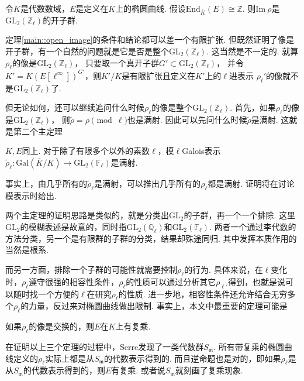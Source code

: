 \begin{cthm}
    令$K$是代数数域，$E$是定义在$K$上的椭圆曲线. 假设$\mathrm{End}_{\overline{K}}(E) \cong \mathbb{Z}$. 则$\mathrm{Im}\ \rho$是$\mathrm{GL}_2(\mathbb{Z}_{\ell})$的开子群. \label{main::open_image}
\end{cthm}

定理\ref{main::open_image}的条件和结论都可以差一个有限扩张.
但既然证明了像是开子群，有一个自然的问题就是它是否是整个$\mathrm{GL}_2(\mathbb{Z}_{\ell})$.
这当然是不一定的. 就算$\rho_{\ell}$的像是$\mathrm{GL}_2(\mathbb{Z}_{\ell})$，
只要取一个真开子群$G'\subset \mathrm{GL}_2(\mathbb{Z}_{\ell})$，
并令$K' = K(E[\ell^{\infty}])^{G'}$，则$K'/K$是有限扩张且定义在$K'$上的$\ell$进表示
$\rho_{\ell}'$的像就不是$\mathrm{GL}_2(\mathbb{Z}_{\ell})$了.

但无论如何，还可以继续追问什么时候$\rho_{\ell}$的像是整个$\mathrm{GL}_2(\mathbb{Z}_{\ell})$.
首先，如果$\rho_{\ell}$的像是$\mathrm{GL}_2(\mathbb{Z}_{\ell})$，
则$\tilde{\rho} = \rho \pmod{\ell}$也是满射.
因此可以先问什么时候$\tilde{\rho}$是满射. 这就是第二个主定理

\begin{cthm}
    $K, E$同上. 对于除了有限多个以外的素数$\ell$，模$\ell$Galois表示$\tilde{\rho}_{\ell}: \mathrm{Gal}(\overline{K}/K)\to \mathrm{GL}_2(\mathbb{F}_{\ell})$是满射. \label{main::surjective}
\end{cthm}

事实上，由几乎所有的$\tilde{\rho}_{\ell}$是满射，可以推出几乎所有的$\rho_{\ell}$都是满射.
证明将在讨论模表示时给出.

两个主定理的证明思路是类似的，就是分类出$\mathrm{GL}_2$的子群，再一个一个排除. 这里$\mathrm{GL}_2$的模糊表述是故意的，同时指$\mathrm{GL}_2(\mathbb{Q}_{\ell})$和$\mathrm{GL}_2(\mathbb{F}_{\ell})$. 两者一个通过李代数的方法分类，另一个是有限群的子群的分类，结果却殊途同归. 其中发挥本质作用的当然是根系.

而另一方面，排除一个子群的可能性就需要控制$\rho_{\ell}$的行为. 具体来说，在$\ell$变化时，$\rho_{\ell}$遵守很强的相容性条件，$\rho_{\ell}$的性质可以通过分析其它$\rho_{\ell'}$得到，也就是说可以随时找一个方便的$\ell$在研究$\rho_{\ell}$的性质. 进一步地，相容性条件还允许结合无穷多个$\rho_{\ell}$的力量，反过来对椭圆曲线做出限制. 事实上，本文中最重要的定理可能是

\begin{cthm}
    如果$\rho_{\ell}$的像是交换的，则$E$在$K$上有复乘.
\end{cthm}

在证明以上三个定理的过程中，Serre发现了一类代数群$S_{\mathfrak{m}}$. 所有带复乘的椭圆曲线定义的$\rho_{\ell}$实际上都是从$S_{\mathfrak{m}}$的代数表示得到的. 而且逆命题也是对的，即如果$\rho_{\ell}$是从$S_{\mathfrak{m}}$的代数表示得到的，则$E$有复乘. 或者说$S_{\mathfrak{m}}$就刻画了复乘现象.


